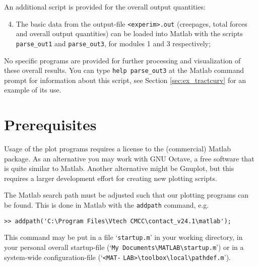 \documentclass[12pt]{report}
\begin{document}
An additional script is provided for the overall output quantities:
\begin{enumerate}\setcounter{enumi}{3}
\item The basic data from the output-file {\tt <experim>.out} (creepages,
        total forces and overall output quantities) can be loaded into
        Matlab with the scripts {\tt parse\_out1} and {\tt parse\_out3},
        for modules 1 and 3 respectively;
\end{enumerate}
No specific programs are provided for further processing and visualization
of these overall results. You can type {\tt help parse\_out3} at the Matlab
command prompt for information about this script, see Section
\ref{sec:ex_tractcurv} for an example of its use.

\section{Prerequisites}

Usage of the plot programs requires a license to the (commercial) Matlab
package. As an alternative you may work with GNU Octave, a free software
that is quite similar to Matlab. Another alternative might be Gnuplot, but
this requires a larger development effort for creating new plotting
scripts.

The Matlab search path must be adjusted such that our plotting programs can
be found. This is done in Matlab with the {\tt addpath} command, e.g.
\begin{verbatim}
>> addpath('C:\Program Files\Vtech CMCC\contact_v24.1\matlab');
\end{verbatim}
This command may be put in a file `{\tt startup.m}' in your working
directory, in your personal overall startup-file
(`\verb+My Documents\MATLAB\startup.m+') or in a system-wide
configuration-file (`\verb+<MAT-+ \verb+LAB>\toolbox\local\pathdef.m+').
\end{document}
